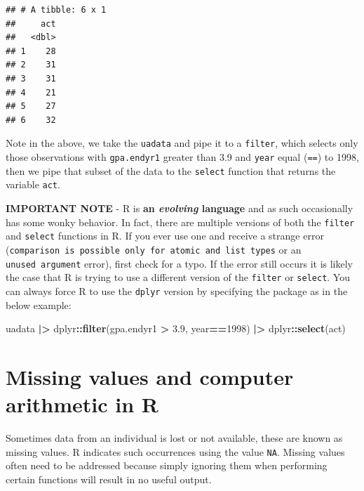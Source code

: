 \documentclass[
]{book}
\newenvironment{Shaded}{\begin{snugshade}}{\end{snugshade}}
\newcommand{\DecValTok}[1]{\textcolor[rgb]{0.00,0.00,0.81}{#1}}
\newcommand{\FloatTok}[1]{\textcolor[rgb]{0.00,0.00,0.81}{#1}}
\newcommand{\FunctionTok}[1]{\textcolor[rgb]{0.13,0.29,0.53}{\textbf{#1}}}
\newcommand{\NormalTok}[1]{#1}
\newcommand{\SpecialCharTok}[1]{\textcolor[rgb]{0.81,0.36,0.00}{\textbf{#1}}}
\begin{document}
\begin{verbatim}
## # A tibble: 6 x 1
##     act
##   <dbl>
## 1    28
## 2    31
## 3    31
## 4    21
## 5    27
## 6    32
\end{verbatim}

Note in the above, we take the \texttt{uadata} and pipe it to a \texttt{filter}, which selects only those observations with \texttt{gpa.endyr1} greater than 3.9 and \texttt{year} equal (\texttt{==}) to 1998, then we pipe that subset of the data to the \texttt{select} function that returns the variable \texttt{act}.

\textbf{IMPORTANT NOTE} - R is \textbf{an \emph{evolving} language} and as such occasionally has some wonky behavior. In fact, there are multiple versions of both the \texttt{filter} and \texttt{select} functions in R. If you ever use one and receive a strange error (\texttt{comparison\ is\ possible\ only\ for\ atomic\ and\ list\ types} or an \texttt{unused\ argument} error), first check for a typo. If the error still occurs it is likely the case that R is trying to use a different version of the \texttt{filter} or \texttt{select}. You can always force R to use the \texttt{dplyr} version by specifying the package as in the below example:

\begin{Shaded}
\begin{Highlighting}[]
\NormalTok{uadata }\SpecialCharTok{|\textgreater{}}
\NormalTok{  dplyr}\SpecialCharTok{::}\FunctionTok{filter}\NormalTok{(gpa.endyr1 }\SpecialCharTok{\textgreater{}} \FloatTok{3.9}\NormalTok{, }
\NormalTok{                year}\SpecialCharTok{==}\DecValTok{1998}\NormalTok{) }\SpecialCharTok{|\textgreater{}}
\NormalTok{  dplyr}\SpecialCharTok{::}\FunctionTok{select}\NormalTok{(act)}
\end{Highlighting}
\end{Shaded}

\hypertarget{missing-values-and-computer-arithmetic-in-r}{%
\section{Missing values and computer arithmetic in R}\label{missing-values-and-computer-arithmetic-in-r}}

Sometimes data from an individual is lost or not available, these are known as missing values. R indicates such occurrences using the value \texttt{NA}. Missing values often need to be addressed because simply ignoring them when performing certain functions will result in no useful output.
\end{document}
